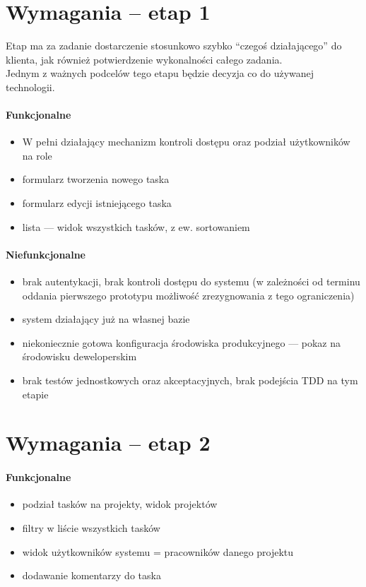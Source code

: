 \documentclass[a4paper,12pt,notitlepage]{mwrep}
\begin{document}
\section{Wymagania -- etap 1}
Etap ma za zadanie dostarczenie stosunkowo szybko “czegoś działającego” do klienta,
jak również potwierdzenie wykonalności całego zadania.\\
Jednym z ważnych podcelów tego etapu będzie decyzja co do używanej technologii.
\paragraph{Funkcjonalne}
\begin{itemize}
	\item	W pełni działający mechanizm kontroli dostępu oraz podział użytkowników na role
	\item	formularz tworzenia nowego taska
	\item	formularz edycji istniejącego taska
	\item	lista --- widok wszystkich tasków, z ew. sortowaniem
\end{itemize}
\paragraph{Niefunkcjonalne}
\begin{itemize}
	\item	brak autentykacji, brak kontroli dostępu do systemu (w zależności od terminu
			oddania pierwszego prototypu możliwość zrezygnowania z tego ograniczenia)
	\item	system działający już na własnej bazie
	\item	niekoniecznie gotowa konfiguracja środowiska produkcyjnego --- pokaz na środowisku deweloperskim
	\item	brak testów jednostkowych oraz akceptacyjnych, brak podejścia TDD na tym etapie
\end{itemize}




\section{Wymagania -- etap 2}
\paragraph{Funkcjonalne}
\begin{itemize}
	\item	podział tasków na projekty, widok projektów
	\item	filtry w liście wszystkich tasków
	\item	widok użytkowników systemu = pracowników danego projektu
	\item	dodawanie komentarzy do taska
\end{itemize}
\end{document}
